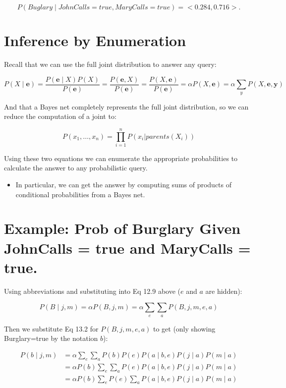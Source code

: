 \documentclass[11pt]{article}
\begin{document}
\begin{equation*}
P(Buglary \mid JohnCalls = true, MaryCalls = true) = <0.284, 0.716>.
\end{equation*}
\section{Inference by Enumeration}
\label{sec:org403d0fd}

Recall that we can use the full joint distribution to answer any query:

\begin{equation*}
P(X \mid \bm{e})
= \frac{P(\bm{e} \mid X) P(X)}{P(\bm{e})}
= \frac{P(\bm{e}, X)}{P(\bm{e})}
= \frac{P(X, \bm{e})}{P(\bm{e})}
= \alpha P(X, \bm{e})
= \alpha \sum_y P(X, \bm{e}, \bm{y}) \tag{12.9}
\end{equation*}


And that a Bayes net completely represents the full joint distribution, so we can reduce the computation of a joint to:

\begin{equation*}
P(x_1, \dots, x_n) = \prod_{i=1}^n P( x_i | parents(X_i)) \tag{13.2}
\end{equation*}

Using these two equations we can enumerate the appropriate probabilities to calculate the answer to any probabilistic query.

\begin{itemize}
\item In particular, we can get the answer by computing sums of products of conditional probabilities from a Bayes net.
\end{itemize}
\section{Example: Prob of Burglary Given JohnCalls = true and MaryCalls = true.}
\label{sec:org9125cbb}

Using abbreviations and substituting into Eq 12.9 above (\(e\) and \(a\) are hidden):

\[
P(B \mid j, m) = \alpha P(B, j, m) = \alpha \sum_e \sum_a P(B, j, m, e, a)
\]

Then we substitute Eq 13.2 for \(P(B, j, m, e, a)\) to get (only showing Burglary=true by the notation \(b\)):

\vspace{-.1in}
\begin{align*}
P(b \mid j, m) &= \alpha \sum_e \sum_a P(b) P(e) P(a \mid b, e) P(j \mid a) P(m \mid a) \tag{1}\\
                &= \alpha P(b) \sum_e \sum_a P(e) P(a \mid b, e) P(j \mid a) P(m \mid a) \tag{2}\\
                &= \alpha P(b) \sum_e P(e) \sum_a P(a \mid b, e) P(j \mid a) P(m \mid a) \tag{3}
\end{align*}
\vspace{-.1in}
\end{document}

